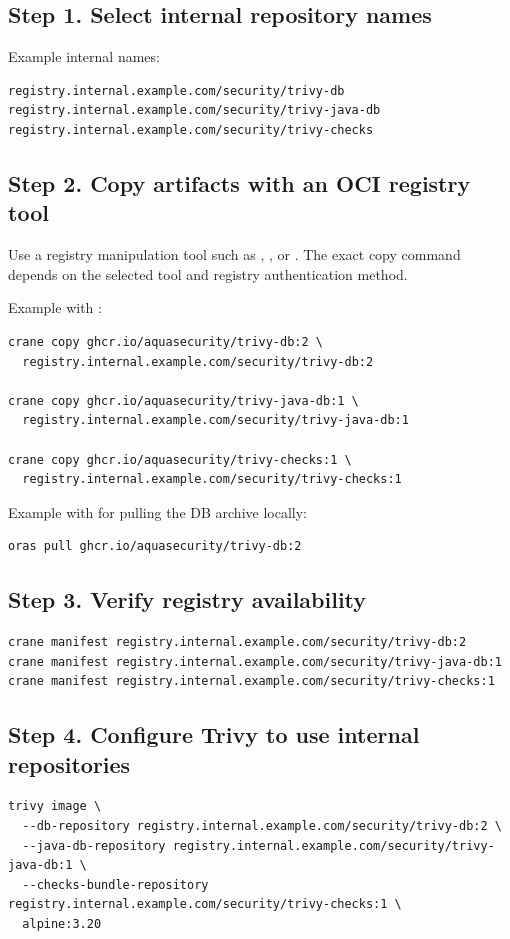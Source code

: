 \documentclass[10pt]{article}
\newcommand{\artifact}[1]{\path{#1}}
\begin{document}
\subsection{Step 1. Select internal repository names}
Example internal names:
\begin{verbatim}
registry.internal.example.com/security/trivy-db
registry.internal.example.com/security/trivy-java-db
registry.internal.example.com/security/trivy-checks
\end{verbatim}

\subsection{Step 2. Copy artifacts with an OCI registry tool}
Use a registry manipulation tool such as \artifact{crane}, \artifact{oras}, or \artifact{regctl}. The exact copy command depends on the selected tool and registry authentication method.

Example with \artifact{crane}:
\begin{verbatim}
crane copy ghcr.io/aquasecurity/trivy-db:2 \
  registry.internal.example.com/security/trivy-db:2

crane copy ghcr.io/aquasecurity/trivy-java-db:1 \
  registry.internal.example.com/security/trivy-java-db:1

crane copy ghcr.io/aquasecurity/trivy-checks:1 \
  registry.internal.example.com/security/trivy-checks:1
\end{verbatim}

Example with \artifact{oras} for pulling the DB archive locally:
\begin{verbatim}
oras pull ghcr.io/aquasecurity/trivy-db:2
\end{verbatim}

\subsection{Step 3. Verify registry availability}
\begin{verbatim}
crane manifest registry.internal.example.com/security/trivy-db:2
crane manifest registry.internal.example.com/security/trivy-java-db:1
crane manifest registry.internal.example.com/security/trivy-checks:1
\end{verbatim}

\subsection{Step 4. Configure Trivy to use internal repositories}
\begin{verbatim}
trivy image \
  --db-repository registry.internal.example.com/security/trivy-db:2 \
  --java-db-repository registry.internal.example.com/security/trivy-java-db:1 \
  --checks-bundle-repository registry.internal.example.com/security/trivy-checks:1 \
  alpine:3.20
\end{verbatim}
\end{document}
